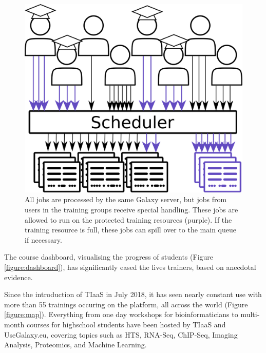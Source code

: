 \documentclass[a4paper,num-refs]{oup-contemporary}
\begin{document}
\begin{figure}[bt!]
\centering
\includegraphics[width=\linewidth]{images/rules.png}
	\caption{All jobs are processed by the same Galaxy server, but jobs from users in the training groups receive special handling. These jobs are allowed to run on the protected training resources (purple). If the training resource is full, these jobs can spill over to the main queue if necessary.}\label{figure:queue}
\end{figure}

The course dashboard, visualising the progress of students (Figure \ref{figure:dashboard}), has significantly eased the lives trainers, based on anecdotal evidence.

Since the introduction of TIaaS in July 2018, it has seen nearly constant use with more than 55 trainings occuring on the platform, all across the world (Figure \ref{figure:map}). Everything from one day workshops for bioinformaticians to multi-month courses for highschool students have been hosted by TIaaS and UseGalaxy.eu, covering topics such as HTS, RNA-Seq, ChIP-Seq, Imaging Analysis, Proteomics, and Machine Learning.
\end{document}
